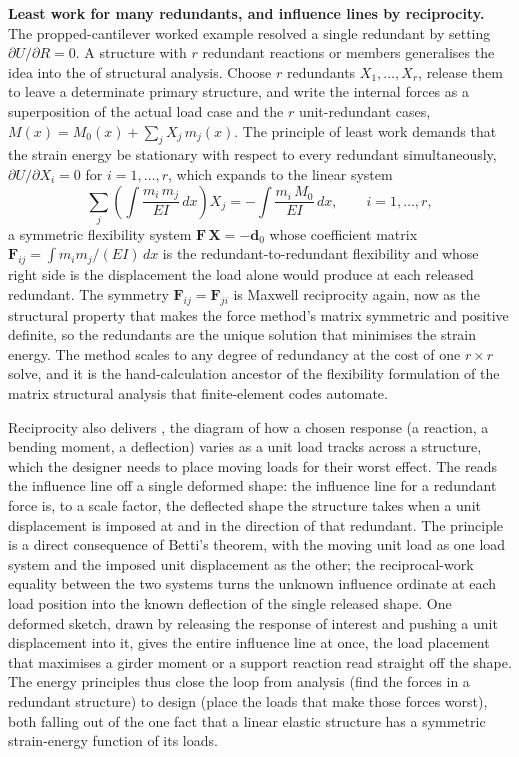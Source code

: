 \begin{mastery}
\textbf{Least work for many redundants, and influence lines by reciprocity.}
The propped-cantilever worked example resolved a single redundant by setting
$\partial U/\partial R = 0$. A structure with $r$ redundant reactions or
members generalises the idea into the  of structural
analysis. Choose $r$ redundants $X_1,\ldots,X_r$, release them to leave a
determinate primary structure, and write the internal forces as a
superposition of the actual load case and the $r$ unit-redundant cases,
$M(x) = M_0(x) + \sum_j X_j\,m_j(x)$. The principle of least work demands
that the strain energy be stationary with respect to every redundant
simultaneously, $\partial U/\partial X_i = 0$ for $i = 1,\ldots,r$, which
expands to the linear system
\[
\sum_j \left(\int \frac{m_i\,m_j}{EI}\,dx\right) X_j
= -\int \frac{m_i\,M_0}{EI}\,dx,
\qquad i = 1,\ldots,r,
\]
a symmetric flexibility system $\mathbf{F}\,\mathbf{X} = -\mathbf{d}_0$ whose
coefficient matrix $\mathbf{F}_{ij} = \int m_i m_j/(EI)\,dx$ is the
redundant-to-redundant flexibility and whose right side is the displacement
the load alone would produce at each released redundant. The symmetry
$\mathbf{F}_{ij} = \mathbf{F}_{ji}$ is Maxwell reciprocity again, now as the
structural property that makes the force method's matrix symmetric and
positive definite, so the redundants are the unique solution that minimises
the strain energy. The method scales to any degree of redundancy at the cost
of one $r\times r$ solve, and it is the hand-calculation ancestor of the
flexibility formulation of the matrix structural analysis that finite-element
codes automate.

Reciprocity also delivers , the diagram of how a
chosen response (a reaction, a bending moment, a deflection) varies as a unit
load tracks across a structure, which the designer needs to place moving
loads for their worst effect. The  reads
the influence line off a single deformed shape: the influence line for a
redundant force is, to a scale factor, the deflected shape the structure
takes when a unit displacement is imposed at and in the direction of that
redundant. The principle is a direct consequence of Betti's theorem, with
the moving unit load as one load system and the imposed unit displacement as
the other; the reciprocal-work equality between the two systems turns the
unknown influence ordinate at each load position into the known deflection of
the single released shape. One deformed sketch, drawn by releasing the
response of interest and pushing a unit displacement into it, gives the
entire influence line at once, the load placement that maximises a girder
moment or a support reaction read straight off the shape. The energy
principles thus close the loop from analysis (find the forces in a redundant
structure) to design (place the loads that make those forces worst), both
falling out of the one fact that a linear elastic structure has a symmetric
strain-energy function of its loads.
\end{mastery}

